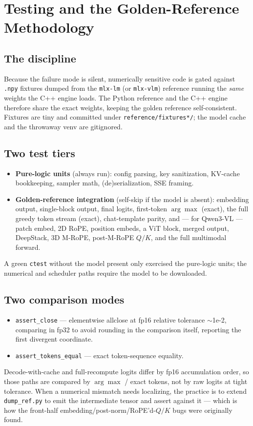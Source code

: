 \documentclass[11pt,a4paper]{report}
\newcommand{\code}[1]{\texttt{#1}}
\begin{document}
\chapter{Testing and the Golden-Reference Methodology}
\label{ch:testing}

\section{The discipline}
Because the failure mode is silent, numerically sensitive code is gated against
\code{.npy} fixtures dumped from the \code{mlx-lm} (or \code{mlx-vlm}) reference
running the \emph{same} weights the C++ engine loads. The Python reference and the
C++ engine therefore share the exact weights, keeping the golden reference
self-consistent. Fixtures are tiny and committed under \code{reference/fixtures*/};
the model cache and the throwaway venv are gitignored.

\section{Two test tiers}
\begin{itemize}[nosep]
  \item \textbf{Pure-logic units} (always run): config parsing, key sanitization,
        KV-cache bookkeeping, sampler math, (de)serialization, SSE framing.
  \item \textbf{Golden-reference integration} (self-skip if the model is absent):
        embedding output, single-block output, final logits, first-token
        $\arg\max$ (exact), the full greedy token stream (exact), chat-template
        parity, and --- for Qwen3-VL --- patch embed, 2D RoPE, position embeds, a
        ViT block, merged output, DeepStack, 3D M-RoPE, post-M-RoPE $Q/K$, and the
        full multimodal forward.
\end{itemize}
A green \code{ctest} without the model present only exercised the pure-logic units;
the numerical and scheduler paths require the model to be downloaded.

\section{Two comparison modes}
\begin{itemize}[nosep]
  \item \code{assert\_close} --- elementwise allclose at fp16 relative tolerance
        $\sim$1e-2, comparing in fp32 to avoid rounding in the comparison itself,
        reporting the first divergent coordinate.
  \item \code{assert\_tokens\_equal} --- exact token-sequence equality.
\end{itemize}
Decode-with-cache and full-recompute logits differ by fp16 accumulation order, so
those paths are compared by $\arg\max$ / exact tokens, not by raw logits at tight
tolerance. When a numerical mismatch needs localizing, the practice is to extend
\code{dump\_ref.py} to emit the intermediate tensor and assert against it --- which
is how the front-half embedding/post-norm/RoPE'd-$Q/K$ bugs were originally found.
\end{document}

